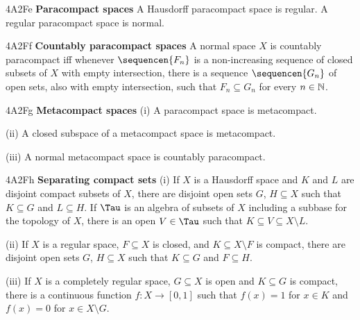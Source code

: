 \spheader 4A2Fe {\bf Paracompact spaces} A Hausdorff paracompact space
is regular.
A regular paracompact
space is normal.

\spheader 4A2Ff {\bf Countably paracompact spaces} A normal space $X$ is
countably paracompact iff whenever $\sequencen{F_n}$
is a non-increasing
sequence of closed subsets of $X$ with empty intersection, there is
a sequence $\sequencen{G_n}$ of open sets, also with empty intersection,
such that $F_n\subseteq G_n$ for every $n\in\Bbb N$.

\spheader 4A2Fg {\bf Metacompact spaces} (i) A paracompact space is
metacompact.

\quad (ii) A closed subspace of a metacompact space is metacompact.

\quad (iii) A normal metacompact space is countably paracompact.

\spheader 4A2Fh {\bf Separating compact sets} (i) If $X$ is a Hausdorff
space and $K$ and $L$ are disjoint compact subsets of $X$, there are
disjoint open sets $G$, $H\subseteq X$ such that $K\subseteq G$ and
$L\subseteq H$.
If $\Tau$ is an algebra of subsets of $X$ including a subbase for the
topology of $X$, there is an open $V\in\Tau$ such that
$K\subseteq V\subseteq X\setminus L$.   

\quad(ii) If $X$ is a regular space, $F\subseteq X$ is closed, and
$K\subseteq X\setminus F$ is compact, there are disjoint open sets $G$,
$H\subseteq X$ such that $K\subseteq G$ and $F\subseteq H$.

\quad(iii) If $X$ is a completely regular space,
$G\subseteq X$ is open and $K\subseteq G$ is compact, there is a
continuous function $f:X\to[0,1]$ such that $f(x)=1$ for $x\in K$ and
$f(x)=0$ for $x\in X\setminus G$.

